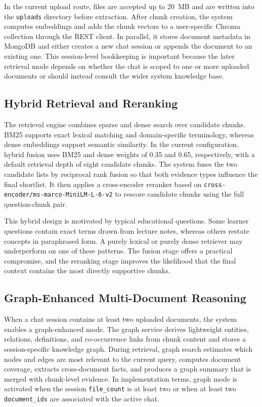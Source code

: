 \documentclass[11pt,a4paper]{article}
\begin{document}
In the current upload route, files are accepted up to 20~MB and are written into the \texttt{uploads} directory before extraction. After chunk creation, the system computes embeddings and adds the chunk vectors to a user-specific Chroma collection through the REST client. In parallel, it stores document metadata in MongoDB and either creates a new chat session or appends the document to an existing one. This session-level bookkeeping is important because the later retrieval mode depends on whether the chat is scoped to one or more uploaded documents or should instead consult the wider system knowledge base.

\subsection{Hybrid Retrieval and Reranking}

The retrieval engine combines sparse and dense search over candidate chunks. BM25 supports exact lexical matching and domain-specific terminology, whereas dense embeddings support semantic similarity. In the current configuration, hybrid fusion uses BM25 and dense weights of 0.35 and 0.65, respectively, with a default retrieval depth of eight candidate chunks. The system fuses the two candidate lists by reciprocal rank fusion so that both evidence types influence the final shortlist. It then applies a cross-encoder reranker based on \texttt{cross-encoder/ms-marco-MiniLM-L-6-v2} to rescore candidate chunks using the full question-chunk pair.

This hybrid design is motivated by typical educational questions. Some learner questions contain exact terms drawn from lecture notes, whereas others restate concepts in paraphrased form. A purely lexical or purely dense retriever may underperform on one of these patterns. The fusion stage offers a practical compromise, and the reranking stage improves the likelihood that the final context contains the most directly supportive chunks.

\subsection{Graph-Enhanced Multi-Document Reasoning}

When a chat session contains at least two uploaded documents, the system enables a graph-enhanced mode. The graph service derives lightweight entities, relations, definitions, and co-occurrence links from chunk content and stores a session-specific knowledge graph. During retrieval, graph search estimates which nodes and edges are most relevant to the current query, computes document coverage, extracts cross-document facts, and produces a graph summary that is merged with chunk-level evidence. In implementation terms, graph mode is activated when the session \texttt{file\_count} is at least two or when at least two \texttt{document\_ids} are associated with the active chat.
\end{document}
